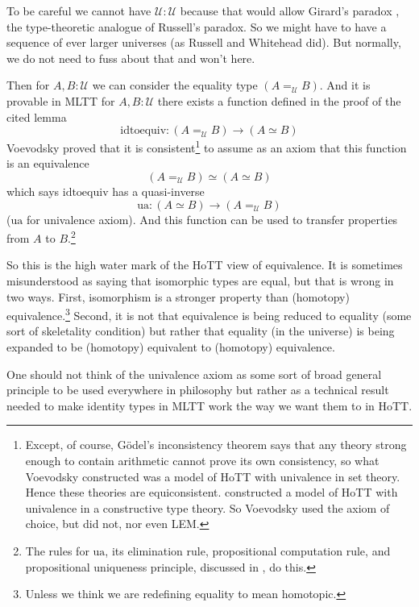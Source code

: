 \documentclass[11pt]{article}
\newcommand{\universe}{\mathcal{U}}
\begin{document}
To be careful we cannot have $\universe : \universe$ because that
would allow Girard's paradox \citep{girard}, the type-theoretic analogue
of Russell's paradox.  So we might have to have a sequence of
ever larger universes (as Russell and Whitehead did).
But normally, we do not need to fuss about that
 and won't here.

Then for $A, B : \universe$ we can consider the equality
type $(A =_\universe B)$.  And it is provable in MLTT
 for $A, B : \universe$ there
exists a function defined in the proof of the cited lemma
$$
   \text{idtoequiv} : (A =_\universe B) \to (A \simeq B)
$$
Voevodsky proved \citep{kapulkin-lumsdaine}
that it is consistent\footnote{Except, of course,
G\"{o}del's inconsistency theorem says that any theory strong enough
to contain arithmetic cannot prove its own consistency, so what
Voevodsky constructed was a model of HoTT with univalence in set theory.
Hence these theories are equiconsistent.  \citet*{bezem-coquand-huber}
constructed a model of HoTT with univalence in a constructive type theory.
So Voevodsky used the axiom of choice, but \citet{bezem-coquand-huber}
did not, nor even LEM.\label{foot:cubical}}
to assume as an axiom that this function is an equivalence
$$
   (A =_\universe B) \simeq (A \simeq B)
$$
which says $\text{idtoequiv}$ has a quasi-inverse
$$
   \text{ua} : (A \simeq B) \to (A =_\universe B)
$$
($\text{ua}$ for univalence axiom).  And this function can be used to
transfer properties from $A$ to $B$.\footnote{The rules for $\text{ua}$,
its elimination rule, propositional computation rule, and propositional
uniqueness principle,
discussed in ,
do this.}

So this is the high water mark of the HoTT view of equivalence.  It
is sometimes misunderstood as saying that isomorphic types are equal,
but that is wrong in two ways.  First, isomorphism is a stronger property
than (homotopy) equivalence.\footnote{Unless we think we are redefining
equality to mean homotopic.}  Second, it is not that equivalence is being
reduced to equality (some sort
of skeletality condition) but rather that equality (in the universe)
is being expanded to be (homotopy) equivalent to (homotopy) equivalence.

One should not think of the univalence axiom as some sort of broad general
principle to be used everywhere in philosophy but rather as a technical result
needed to make identity types in MLTT work the way we want them to in HoTT.
\end{document}
